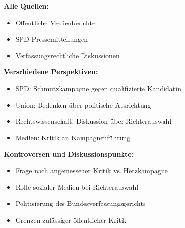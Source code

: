 \documentclass[12pt,a4paper]{article}
\begin{document}
\textbf{Alle Quellen:}
\begin{itemize}
\item Öffentliche Medienberichte
\item SPD-Pressemitteilungen
\item Verfassungsrechtliche Diskussionen
\end{itemize}

\textbf{Verschiedene Perspektiven:}
\begin{itemize}
\item SPD: Schmutzkampagne gegen qualifizierte Kandidatin
\item Union: Bedenken über politische Ausrichtung
\item Rechtswissenschaft: Diskussion über Richterauswahl
\item Medien: Kritik an Kampagnenführung
\end{itemize}

\textbf{Kontroversen und Diskussionspunkte:}
\begin{itemize}
\item Frage nach angemessener Kritik vs. Hetzkampagne
\item Rolle sozialer Medien bei Richterauswahl
\item Politisierung des Bundesverfassungsgerichts
\item Grenzen zulässiger öffentlicher Kritik
\end{itemize}
\end{document}
